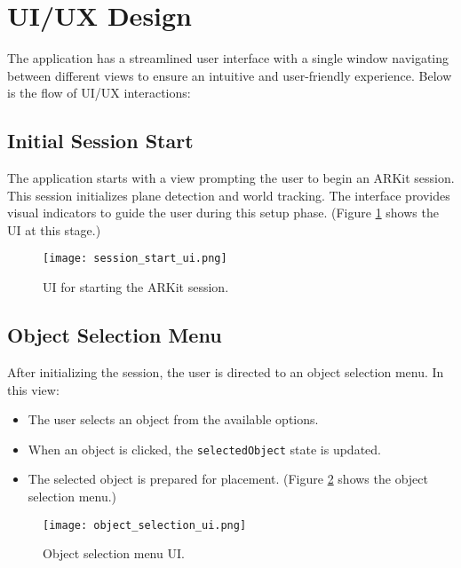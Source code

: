\section{UI/UX Design}

The application has a streamlined user interface with a single window navigating between different views to ensure an intuitive and user-friendly experience. Below is the flow of UI/UX interactions:

\subsection{Initial Session Start}
The application starts with a view prompting the user to begin an ARKit session. This session initializes plane detection and world tracking. The interface provides visual indicators to guide the user during this setup phase. (Figure \ref{fig:ui_session_start} shows the UI at this stage.)
\begin{figure}[h!]
    \centering
    \texttt{[image: session\_start\_ui.png]} %
    \caption{UI for starting the ARKit session.}
    \label{fig:ui_session_start}
\end{figure}
\subsection{Object Selection Menu}
After initializing the session, the user is directed to an object selection menu. In this view:
\begin{itemize}
    \item The user selects an object from the available options.
    \item When an object is clicked, the \texttt{selectedObject} state is updated.
    \item The selected object is prepared for placement. (Figure \ref{fig:ui_object_selection} shows the object selection menu.)
\end{itemize}
\begin{figure}[h!]
    \centering
    \texttt{[image: object\_selection\_ui.png]} %
    \caption{Object selection menu UI.}
    \label{fig:ui_object_selection}
\end{figure}

